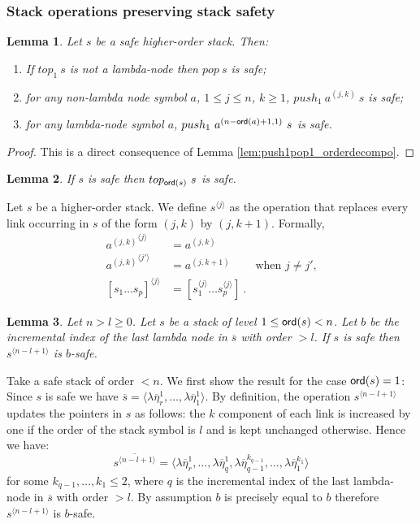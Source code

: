 \documentclass{article}
\newtheorem{lemma}{Lemma}[section]
\theoremstyle{remark}
\theoremstyle{definition}
\newcommand\orddec\overline
\begin{document}
\subsubsection{Stack operations preserving stack safety}
\begin{lemma}
\label{lem:push1pop1_preserves_safety} Let $s$ be a safe higher-order
stack. Then:
\begin{enumerate}
  \item If $top_1\ s$ is not a lambda-node then $pop\ s$ is safe;
  \item for any non-lambda node symbol $a$, $1 \leq j \leq n$, $k \geq 1$, $push_1\ a^{(j,k)}\ s$ is safe;
  \item for any lambda-node symbol $a$, $push_1\ a^{(n-{\sf ord}(a)+1,1)}\ s$ is safe.
\end{enumerate}
\end{lemma}
\begin{proof}
This is a direct consequence of Lemma
\ref{lem:push1pop1_orderdecompo}.
\end{proof}


\begin{lemma}
\label{lem:top_qsafe} If $s$ is safe then $top_{{\sf ord}(s)}~s$ is safe.
\end{lemma}


Let $s$ be a higher-order stack. We define $s^{\langle j \rangle}$ as the operation that replaces
every link occurring in $s$ of the form $(j,k)$ by $(j,k+1)$. Formally,
\begin{align*}
{a^{(j,k)}}^{\langle j \rangle} &= a^{(j,k)}   \\
{a^{(j,k)}}^{\langle j' \rangle} &= a^{(j,k+1)} &   \mbox{when $j\neq j'$,}\\
[s_1 \ldots s_p]^{\langle j \rangle} &= [s_1^{\langle j \rangle} \ldots s_p^{\langle j \rangle}] \ .
\end{align*}

\begin{lemma}
\label{lem:incrk_qsafe}
Let $n>l\geq 0$. Let $s$ be a stack of level $1\leq {\sf ord}(s) <n$.
 Let $b$ be the incremental index of the last lambda node in $\orddec{s}$
 with order $>l$.
If $s$ is safe then $s^{\langle n-l+1 \rangle}$ is $b$-safe.
\end{lemma}
\proof Take a safe stack of order $<n$.
 We first show the result for the case ${\sf ord}(s) = 1$:
Since $s$ is safe we have
$\orddec{s} = \langle \lambda \overline{\eta}_r^1
, \ldots, \lambda \overline{\eta}_1^1   \rangle$.
By definition, the operation $s^{\langle n-l+1 \rangle}$ updates the pointers in $s$  as follows:
the $k$ component of each link is increased by one if the order of
the stack symbol is $l$ and is kept unchanged otherwise.
Hence we have:
\begin{equation*}
\orddec{s^{\langle n-l+1 \rangle}} = \langle
\lambda \overline{\eta}_r^1, \ldots,  \lambda \overline{\eta}_{q}^1, \lambda \overline{\eta}_{q-1}^{k_{q-1}}, \ldots,
 \lambda \overline{\eta}_1^{k_1} \rangle
\end{equation*}
for some $k_{q-1}, \ldots , k_1 \leq 2$, where $q$ is the incremental index of the last lambda-node in $\orddec{s}$ with order $>l$. By assumption $b$ is precisely equal to $b$ therefore $s^{\langle n-l+1 \rangle}$ is $b$-safe.
\end{document}

